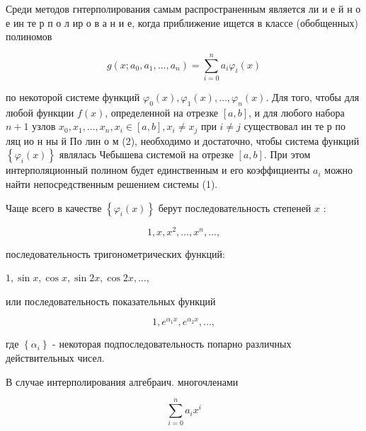 \documentclass[10pt]{article}
\begin{document}
Среди методов гнтерполирования самым распространенным является ли и е й н о е ин те р п о л ир о в а н и е, когда приближение ищется в классе (обобщенных) полиномов



\[

g\left(x ; a_{0}, a_{1}, \ldots, a_{n}\right)=\sum_{i=0}^{n} a_{i} \varphi_{i}(x)

\]



по некоторой системе функций $\varphi_{0}(x), \varphi_{1}(x), \ldots, \varphi_{n}(x)$. Для того, чтобы для любой функции $f(x)$, определенной на отрезке $[a, b]$, и для любого набора $n+1$ узлов $x_{0}, x_{1}, \ldots, x_{n}, x_{i} \in[a, b], x_{i} \neq x_{j}$ при $i \neq j$ существовал ин те р по ляц ио н ны й По лин о м (2), необходимо и достаточно, чтобы система функций $\left\{\varphi_{i}(x)\right\}$ являлась Чебышева системой на отрезке $[a, b]$. При этом интерполяционный полином будет единственным и его коэффициенты $a_{i}$ можно найти непосредственным решением системы (1).



Чаще всего в качестве $\left\{\varphi_{i}(x)\right\}$ берут последовательность степеней $x$ :



\[

1, x, x^{2}, \ldots, x^{n}, \ldots,

\]



последовательность тригонометрических функций:



$1, \sin x, \cos x, \sin 2 x, \cos 2 x, \ldots$,



или последовательность показательных функций



\[

1, e^{\alpha_{1} x}, e^{\alpha_{2} x}, \ldots,

\]



где $\left\{\alpha_{i}\right\}$ - некоторая подпоследовательность попарно различных действительных чисел.



В случае интерполирования алгебраич. многочленами



\[

\sum_{i=0}^{n} a_{i} x^{i}

\]
\end{document}
